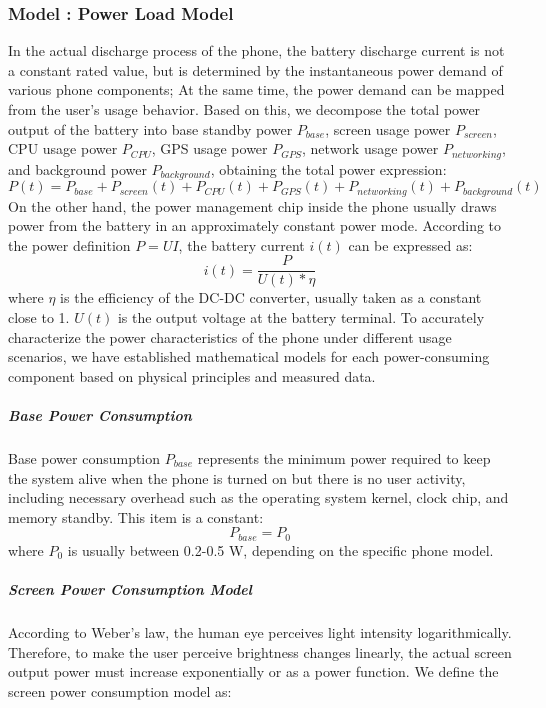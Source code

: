 \documentclass{mcmthesis}
\newcommand{\Rmnum}[1]{\uppercase\expandafter{\romannumeral #1}}  %
\begin{document}
\subsubsection{Model \Rmnum{2}: Power Load Model}
 In the actual discharge process of the phone, the battery discharge current is not a constant rated value, but is determined by the instantaneous power demand of various phone components;
 At the same time, the power demand can be mapped from the user's usage behavior.
 Based on this, we decompose the total power output of the battery into base standby power $P_{base}$, screen usage power $P_{screen}$, CPU usage power $P_{CPU}$,
 GPS usage power $P_{GPS}$, network usage power $P_{networking}$, and background power $P_{background}$,
 obtaining the total power expression:
 \begin{equation}
    P(t)=P_{base}+P_{screen}(t)+P_{CPU}(t)+P_{GPS}(t)+P_{networking}(t)+P_{background}(t)
  \end{equation}
 On the other hand, the power management chip inside the phone usually draws power from the battery in an approximately constant power mode. According to the power definition $P=UI$, the battery current $i(t)$ can be expressed as:
  \begin{equation}
  i(t)=\frac{P}{U(t)\ast\eta}
  \end{equation}
  where $\eta$ is the efficiency of the DC-DC converter, usually taken as a constant close to 1. $U(t)$ is the output voltage at the battery terminal.
To accurately characterize the power characteristics of the phone under different usage scenarios, we have established mathematical models for each power-consuming component based on physical principles and measured data.
\subparagraph{Base Power Consumption}
Base power consumption $P_{{base}}$ represents the minimum power required to keep the system alive when the phone is turned on but there is no user activity, including necessary overhead such as the operating system kernel, clock chip, and memory standby. This item is a constant:
\begin{equation}
    P_{{base}} = P_0
\end{equation}
where $P_0$ is usually between 0.2-0.5 W, depending on the specific phone model.
\subparagraph{Screen Power Consumption Model}
According to Weber's law, the human eye perceives light intensity logarithmically. Therefore, to make the user perceive brightness changes linearly, the actual screen output power must increase exponentially or as a power function. We define the screen power consumption model as:
\end{document}
